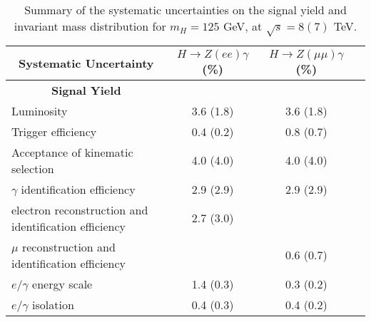 \begin{table}[!htbp]
\centering
\caption{Summary of the systematic uncertainties on the signal yield and
  invariant mass distribution for $m_H = 125$ GeV, at $\sqrt{s}=8 (7)$ TeV.}
  \label{tab:zg_syst_125_8_7tev} 
\small
 \begin{tabular}{cccc}
       \hline
       \hline
       \textbf{Systematic Uncertainty }           & $H \rightarrow Z(ee) \gamma$(\%)   & $H \rightarrow Z(\mu\mu) \gamma$(\%) \\
       \hline
       \textbf{Signal Yield}                      &                                    &                                      \\ 
       \hline
       \multicolumn{1}{l}{Luminosity}                                 & 3.6 (1.8)                        & 3.6 (1.8)          \\
       \multicolumn{1}{l}{Trigger efficiency}                         & 0.4 (0.2)                        & 0.8 (0.7)          \\
       \multicolumn{1}{l}{Acceptance of kinematic selection}          & 4.0 (4.0)                        & 4.0 (4.0)          \\
       \multicolumn{1}{l}{$\gamma$ identification efficiency}         & 2.9 (2.9)                        & 2.9 (2.9)          \\  
       \multicolumn{1}{l}{electron reconstruction and identification efficiency} & 2.7 (3.0)             &                    \\  
       \multicolumn{1}{l}{$\mu$ reconstruction and identification efficiency}    &                       & 0.6 (0.7)          \\  
       \multicolumn{1}{l}{$e/\gamma$ energy scale}                    & 1.4 (0.3)                        & 0.3 (0.2)          \\
       \multicolumn{1}{l}{$e/\gamma$ isolation}                       & 0.4 (0.3)                        & 0.4 (0.2)          \\  

\end{tabular}
\end{table}
